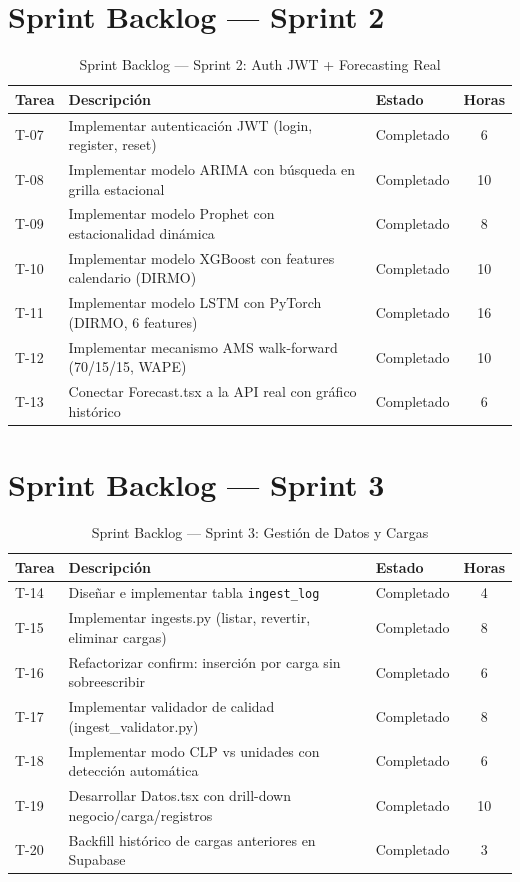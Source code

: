 \documentclass[12pt, a4paper]{report}
\begin{document}
\section{Sprint Backlog — Sprint 2}

\begin{table}[H]
  \centering
  \caption{Sprint Backlog — Sprint 2: Auth JWT + Forecasting Real}
  \label{tab:sprint2}
  \begin{tabular}{|l|p{6cm}|l|c|}
    \hline
    \textbf{Tarea} & \textbf{Descripción} & \textbf{Estado} & \textbf{Horas} \\
    \hline
    T-07 & Implementar autenticación JWT (login, register, reset)      & Completado & 6 \\
    T-08 & Implementar modelo ARIMA con búsqueda en grilla estacional  & Completado & 10 \\
    T-09 & Implementar modelo Prophet con estacionalidad dinámica      & Completado & 8 \\
    T-10 & Implementar modelo XGBoost con features calendario (DIRMO)  & Completado & 10 \\
    T-11 & Implementar modelo LSTM con PyTorch (DIRMO, 6 features)     & Completado & 16 \\
    T-12 & Implementar mecanismo AMS walk-forward (70/15/15, WAPE)     & Completado & 10 \\
    T-13 & Conectar Forecast.tsx a la API real con gráfico histórico   & Completado & 6 \\
    \hline
  \end{tabular}
\end{table}

\section{Sprint Backlog — Sprint 3}

\begin{table}[H]
  \centering
  \caption{Sprint Backlog — Sprint 3: Gestión de Datos y Cargas}
  \label{tab:sprint3}
  \begin{tabular}{|l|p{6cm}|l|c|}
    \hline
    \textbf{Tarea} & \textbf{Descripción} & \textbf{Estado} & \textbf{Horas} \\
    \hline
    T-14 & Diseñar e implementar tabla \texttt{ingest\_log}             & Completado & 4 \\
    T-15 & Implementar ingests.py (listar, revertir, eliminar cargas)   & Completado & 8 \\
    T-16 & Refactorizar confirm: inserción por carga sin sobreescribir  & Completado & 6 \\
    T-17 & Implementar validador de calidad (ingest\_validator.py)      & Completado & 8 \\
    T-18 & Implementar modo CLP vs unidades con detección automática    & Completado & 6 \\
    T-19 & Desarrollar Datos.tsx con drill-down negocio/carga/registros & Completado & 10 \\
    T-20 & Backfill histórico de cargas anteriores en Supabase          & Completado & 3 \\
    \hline
  \end{tabular}
\end{table}
\end{document}
